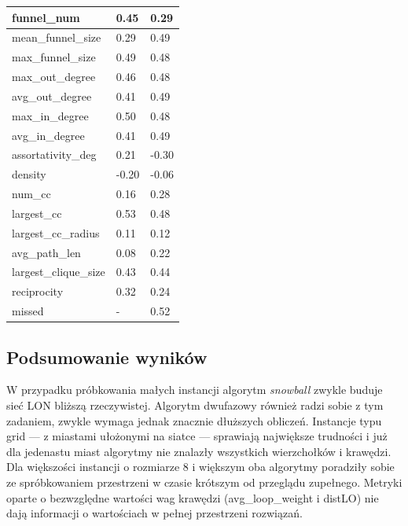 \begin{table}[]
\begin{tabular}{|l|l|l|}
        funnel\_num           & 0.45          & 0.29           \\ \hline
        mean\_funnel\_size    & 0.29          & 0.49           \\ \hline
        max\_funnel\_size     & 0.49          & 0.48           \\ \hline
        max\_out\_degree      & 0.46          & 0.48           \\ \hline
        avg\_out\_degree      & 0.41          & 0.49           \\ \hline
        max\_in\_degree       & 0.50          & 0.48           \\ \hline
        avg\_in\_degree       & 0.41          & 0.49           \\ \hline
        assortativity\_deg    & 0.21          & -0.30          \\ \hline
        density               & -0.20         & -0.06          \\ \hline
        num\_cc               & 0.16          & 0.28           \\ \hline
        largest\_cc           & 0.53          & 0.48           \\ \hline
        largest\_cc\_radius   & 0.11          & 0.12           \\ \hline
        avg\_path\_len        & 0.08          & 0.22           \\ \hline
        largest\_clique\_size & 0.43          & 0.44           \\ \hline
        reciprocity           & 0.32          & 0.24           \\ \hline
        missed                & -             & 0.52           \\ \hline
    \end{tabular}
\end{table}


\subsection{Podsumowanie wyników}
W przypadku próbkowania małych instancji algorytm \textit{snowball} zwykle buduje sieć LON bliższą rzeczywistej.
Algorytm dwufazowy również radzi sobie z tym zadaniem, zwykle wymaga jednak znacznie dłuższych obliczeń.
Instancje typu grid --- z miastami ułożonymi na siatce --- sprawiają największe trudności i już dla jedenastu miast algorytmy nie znalazły
wszystkich wierzchołków i krawędzi.
Dla większości instancji o rozmiarze 8 i większym oba algorytmy poradziły sobie ze spróbkowaniem przestrzeni w czasie krótszym od przeglądu zupełnego.
Metryki oparte o bezwzględne wartości wag krawędzi (avg\_loop\_weight i distLO) nie dają informacji o wartościach w pełnej przestrzeni rozwiązań.

